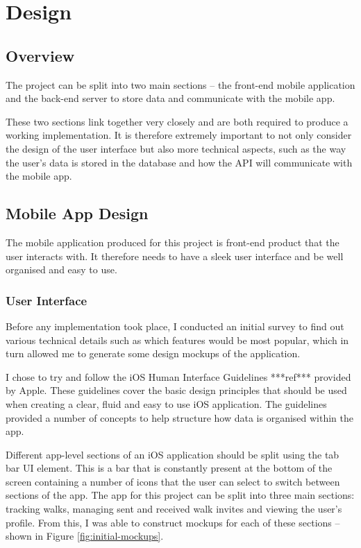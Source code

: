 \chapter{Design}

\section{Overview}

The project can be split into two main sections -- the front-end mobile application and the back-end server to store data and communicate with the mobile app.

These two sections link together very closely and are both required to produce a working implementation. It is therefore extremely important to not only consider the design of the user interface but also more technical aspects, such as the way the user's data is stored in the database and how the API will communicate with the mobile app.

\section{Mobile App Design}


The mobile application produced for this project is front-end product that the user interacts with. It therefore needs to have a sleek user interface and be well organised and easy to use.

\subsection{User Interface} \label{subsection:user-interface}

Before any implementation took place, I conducted an initial survey to find out various technical details such as which features would be most popular, which in turn allowed me to generate some design mockups of the application.

I chose to try and follow the iOS Human Interface Guidelines ***ref*** provided by Apple. These guidelines cover the basic design principles that should be used when creating a clear, fluid and easy to use iOS application. The guidelines provided a number of concepts to help structure how data is organised within the app.

Different app-level sections of an iOS application should be split using the tab bar UI element. This is a bar that is constantly present at the bottom of the screen containing a number of icons that the user can select to switch between sections of the app. The app for this project can be split into three main sections: tracking walks, managing sent and received walk invites and viewing the user's profile. From this, I was able to construct mockups for each of these sections -- shown in Figure \ref{fig:initial-mockups}.


